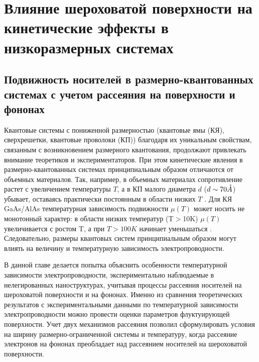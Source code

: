 \chapter{Влияние шероховатой поверхности на кинетические эффекты в низкоразмерных системах} \label{chapt3}

\section{ Подвижность носителей в размерно-квантованных системах с учетом рассеяния на поверхности и фононах}

Квантовые системы с пониженной размерностью (квантовые ямы (КЯ), сверхрешетки, квантовые проволоки (КП)) благодаря их уникальным свойствам, связанным с возникновением размерного квантования, продолжают привлекать внимание теоретиков и экспериментаторов. При этом кинетические явления в размерно-квантованных системах принципиальным образом отличаются от объемных материалов. Так, например, в объемных материалах сопротивление растет с увеличением температуры $T$, а в КП малого диаметра $d$ ($d \sim 70 \AA$) убывает, оставаясь практически постоянным в области низких $T$ \cite{Lin2000,Lin2003,Heremans1998,Zhang2000,Heremans2000}. Для КЯ GaAs/AlAs температурная зависимость подвижности $\mu (T)$ может носить не монотонный характер: в области низких температур (T$>$10K) $\mu (T)$ увеличивается с ростом T, а при $T>100K$ начинает уменьшаться \cite{Lin2000,Sakaki1987}. Следовательно, размеры квантовых систем принципиальным образом могут влиять на величину и температурную зависимость электропроводности.

В данной главе делается попытка объяснить особенности температурной зависимости электропроводности, экспериментально наблюдаемые в нелегированных наноструктурах, учитывая процессы рассеяния носителей на шероховатой поверхности и на фононах. Именно из сравнения теоретических результатов с экспериментальными данными по температурной зависимости электропроводности можно провести оценки параметров флуктуирующей поверхности. Учет двух механизмов рассеяния позволил сформулировать условия на ширину размерно-ограниченной системы и температуру, когда рассеяние электронов на фононах преобладает над рассеянием носителей на шероховатой поверхности.

